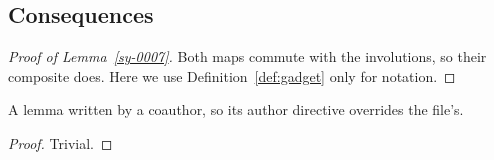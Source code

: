 \subsection{Consequences}\label{sy-0201}







\begin{proof}[Proof of Lemma~\ref{sy-0007}]
Both maps commute with the involutions, so their composite does. Here we use Definition~\ref{def:gadget} only for notation.
\end{proof}

\begin{lemma}\label{sy-0202}
A lemma written by a coauthor, so its author directive overrides the file's.
\end{lemma}
\begin{proof}
Trivial.
\end{proof}
